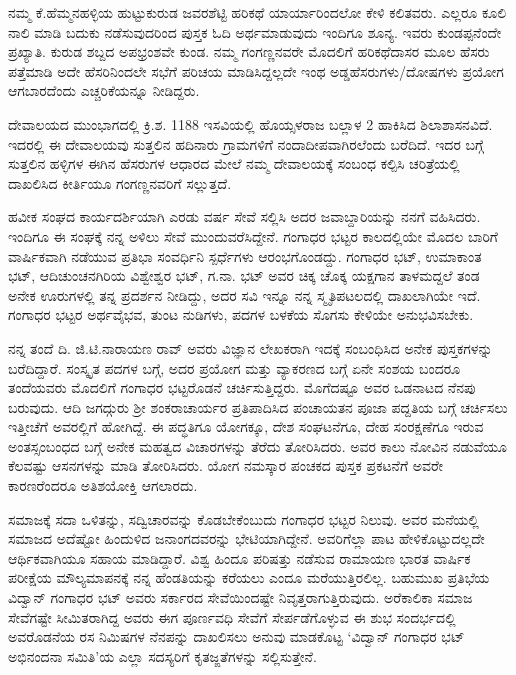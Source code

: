 {ನಮ್ಮ ಕೆ.ಹೆಮ್ಮನಹಳ್ಳಿಯ ಹುಟ್ಟುಕುರುಡ ಜವರಶೆಟ್ಟಿ ಹರಿಕಥೆ ಯಾರ್ಯಾರಿಂದಲೋ ಕೇಳಿ ಕಲಿತವರು. ಎಲ್ಲರೂ ಕೂಲಿ  \enginline{-}  ನಾಲಿ ಮಾಡಿ ಬದುಕು ನಡೆಸುವುದರಿಂದ ಪುಸ್ತಕ ಓದಿ ಅರ್ಥಮಾಡುವುದು ಇಂದಿಗೂ ಶೂನ್ಯ. ಇವರು ಕುಂಡಪ್ಪನೆಂದೇ ಪ್ರಖ್ಯಾತಿ. ಕುರುಡ ಶಬ್ದದ ಅಪಭ್ರಂಶವೇ ಕುಂಡ. ನಮ್ಮ ಗಂಗಣ್ಣನವರೇ ಮೊದಲಿಗೆ ಹರಿಕಥೆದಾಸರ ಮೂಲ ಹೆಸರು ಪತ್ತೆಮಾಡಿ ಅದೇ ಹೆಸರಿನಿಂದಲೇ ಸಭೆಗೆ ಪರಿಚಯ ಮಾಡಿಸಿದ್ದಲ್ಲದೇ ಇಂಥ ಅಡ್ಡಹೆಸರುಗಳು/ದೋಷಗಳು ಪ್ರಯೋಗ ಆಗಬಾರದೆಂದು ಎಚ್ಚರಿಕೆಯನ್ನೂ ನೀಡಿದ್ದರು.

ದೇವಾಲಯದ ಮುಂಭಾಗದಲ್ಲಿ ಕ್ರಿ.ಶ. 1188 ಇಸವಿಯಲ್ಲಿ ಹೊಯ್ಸಳರಾಜ ಬಲ್ಲಾಳ 2 ಹಾಕಿಸಿದ ಶಿಲಾಶಾಸನವಿದೆ. ಇದರಲ್ಲಿ ಈ ದೇವಾಲಯವು ಸುತ್ತಲಿನ ಹದಿನಾರು ಗ್ರಾಮಗಳಿಗೆ ನಂದಾದೀಪವಾಗಿರಲೆಂದು ಬರೆದಿದೆ. ಇದರ ಬಗ್ಗೆ ಸುತ್ತಲಿನ ಹಳ್ಳಿಗಳ ಈಗಿನ ಹೆಸರುಗಳ ಆಧಾರದ ಮೇಲೆ ನಮ್ಮ ದೇವಾಲಯಕ್ಕೆ ಸಂಬಂಧ ಕಲ್ಪಿಸಿ ಚರಿತ್ರೆಯಲ್ಲಿ ದಾಖಲಿಸಿದ ಕೀರ್ತಿಯೂ ಗಂಗಣ್ಣನವರಿಗೆ ಸಲ್ಲುತ್ತದೆ.

ಹವೀಕ ಸಂಘದ ಕಾರ್ಯದರ್ಶಿಯಾಗಿ ಎರಡು ವರ್ಷ ಸೇವೆ ಸಲ್ಲಿಸಿ ಅದರ ಜವಾಬ್ದಾರಿಯನ್ನು ನನಗೆ ವಹಿಸಿದರು. ಇಂದಿಗೂ ಈ ಸಂಘಕ್ಕೆ ನನ್ನ ಅಳಿಲು ಸೇವೆ ಮುಂದುವರೆಸಿದ್ದೇನೆ. ಗಂಗಾಧರ ಭಟ್ಟರ ಕಾಲದಲ್ಲಿಯೇ ಮೊದಲ ಬಾರಿಗೆ ವಾರ್ಷಿಕವಾಗಿ ನಡೆಯುವ ಪ್ರತಿಭಾ ಸಂವರ್ಧಿನಿ ಸ್ಪರ್ಧೆಗಳು ಆರಂಭಗೊಂಡದ್ದು. ಗಂಗಾಧರ ಭಟ್, ಉಮಾಕಾಂತ ಭಟ್, ಆದಿಚುಂಚನಗಿರಿಯ ವಿಶ್ವೇಶ್ವರ ಭಟ್, ಗ.ನಾ. ಭಟ್ ಅವರ ಚಿಕ್ಕ  \enginline{-}  ಚೊಕ್ಕ ಯಕ್ಷಗಾನ ತಾಳಮದ್ದಲೆ ತಂಡ ಅನೇಕ ಊರುಗಳಲ್ಲಿ ತನ್ನ ಪ್ರದರ್ಶನ ನೀಡಿದ್ದು, ಅದರ ಸವಿ ಇನ್ನೂ ನನ್ನ ಸ್ಮೃತಿಪಟಲದಲ್ಲಿ ದಾಖಲಾಗಿಯೇ ಇದೆ. ಗಂಗಾಧರ ಭಟ್ಟರ ಅರ್ಥವೈಭವ, ತುಂಟ ನುಡಿಗಳು, ಪದಗಳ ಬಳಕೆಯ ಸೊಗಸು ಕೇಳಿಯೇ ಅನುಭವಿಸಬೇಕು.

ನನ್ನ ತಂದೆ ದಿ. ಜಿ.ಟಿ.ನಾರಾಯಣ ರಾವ್ ಅವರು ವಿಜ್ಞಾನ ಲೇಖಕರಾಗಿ ಇದಕ್ಕೆ ಸಂಬಂಧಿಸಿದ ಅನೇಕ ಪುಸ್ತಕಗಳನ್ನು ಬರೆದಿದ್ದಾರೆ. ಸಂಸ್ಕೃತ ಪದಗಳ ಬಗ್ಗೆ, ಅದರ ಪ್ರಯೋಗ ಮತ್ತು ವ್ಯಾಕರಣದ ಬಗ್ಗೆ ಏನೇ ಸಂಶಯ ಬಂದರೂ ತಂದೆಯವರು ಮೊದಲಿಗೆ ಗಂಗಾಧರ ಭಟ್ಟರೊಡನೆ ಚರ್ಚಿಸುತ್ತಿದ್ದರು. ಮೊಗೆದಷ್ಟೂ ಅವರ ಒಡನಾಟದ ನೆನಪು ಬರುವುದು. ಆದಿ ಜಗದ್ಗುರು ಶ್ರೀ ಶಂಕರಾಚಾರ್ಯರ ಪ್ರತಿಪಾದಿಸಿದ ಪಂಚಾಯತನ ಪೂಜಾ ಪದ್ದತಿಯ ಬಗ್ಗೆ ಚರ್ಚಿಸಲು ಇತ್ತೀಚೆಗೆ ಅವರಲ್ಲಿಗೆ ಹೋಗಿದ್ದೆ. ಈ ಪದ್ಧತಿಗೂ ಯೋಗಕ್ಕೂ, ದೇಶ ಸಂಘಟನೆಗೂ, ದೇಹ ಸಂರಕ್ಷಣೆಗೂ ಇರುವ ಅಂತಸ್ಸಂಬಂಧದ ಬಗ್ಗೆ ಅನೇಕ ಮಹತ್ವದ ವಿಚಾರಗಳನ್ನು ತೆರೆದು ತೋರಿಸಿದರು. ಅವರ ಕಾಲು ನೋವಿನ ನಡುವೆಯೂ ಕೆಲವಷ್ಟು ಆಸನಗಳನ್ನು ಮಾಡಿ ತೋರಿಸಿದರು. ಯೋಗ ನಮಸ್ಕಾರ ಪಂಚಕದ ಪುಸ್ತಕ ಪ್ರಕಟನೆಗೆ ಅವರೇ ಕಾರಣರೆಂದರೂ ಅತಿಶಯೋಕ್ತಿ ಆಗಲಾರದು. 

ಸಮಾಜಕ್ಕೆ ಸದಾ ಒಳಿತನ್ನು, ಸದ್ವಿಚಾರವನ್ನು ಕೊಡಬೇಕೆಂಬುದು ಗಂಗಾಧರ ಭಟ್ಟರ ನಿಲುವು. ಅವರ ಮನೆಯಲ್ಲಿ ಸಮಾಜದ ಅದೆಷ್ಟೋ ಹಿಂದುಳಿದ ಜನಾಂಗದವರನ್ನು ಭೇಟಿಯಾಗಿದ್ದೇನೆ. ಅವರಿಗೆಲ್ಲಾ ಪಾಟ ಹೇಳಿಕೊಟ್ಟುದಲ್ಲದೇ  ಆರ್ಥಿಕವಾಗಿಯೂ ಸಹಾಯ ಮಾಡಿದ್ದಾರೆ. ವಿಶ್ವ ಹಿಂದೂ ಪರಿಷತ್ತು ನಡೆಸುವ ರಾಮಾಯಣ  \enginline{-}  ಭಾರತ ವಾರ್ಷಿಕ ಪರೀಕ್ಷೆಯ ಮೌಲ್ಯಮಾಪನಕ್ಕೆ ನನ್ನ ಹೆಂಡತಿಯನ್ನು ಕರೆಯಲು ಎಂದೂ ಮರೆಯುತ್ತಿರಲಿಲ್ಲ.   ಬಹುಮುಖ ಪ್ರತಿಭೆಯ ವಿದ್ವಾನ್ ಗಂಗಾಧರ ಭಟ್ ಅವರು ಸರ್ಕಾರದ ಸೇವೆಯಿಂದಷ್ಟೇ ನಿವೃತ್ತರಾಗುತ್ತಿರುವುದು. ಅರೆಕಾಲಿಕಾ ಸಮಾಜ ಸೇವೆಗಷ್ಟೇ ಸೀಮಿತರಾಗಿದ್ದ ಅವರು ಈಗ ಪೂರ್ಣವಧಿ ಸೇವೆಗೆ ಸೇರ್ಪಡೆಗೊಳ್ಳುವ ಈ ಶುಭ ಸಂದರ್ಭದಲ್ಲಿ ಅವರೊಡನೆಯ ರಸ ನಿಮಿಷಗಳ ನೆನಪನ್ನು ದಾಖಲಿಸಲು ಅನುವು ಮಾಡಕೊಟ್ಟ ‘ವಿದ್ವಾನ್ ಗಂಗಾಧರ ಭಟ್ ಅಭಿನಂದನಾ ಸಮಿತಿ’ಯ ಎಲ್ಲಾ ಸದಸ್ಯರಿಗೆ ಕೃತಜ್ಙತೆಗಳನ್ನು ಸಲ್ಲಿಸುತ್ತೇನೆ.                 

\articleend
}
